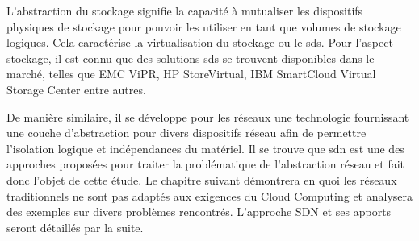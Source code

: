 L'abstraction du stockage signifie la capacité à mutualiser les dispositifs physiques de stockage pour pouvoir les utiliser en tant que volumes de stockage logiques. Cela caractérise la virtualisation du stockage ou le \gls{sds}. Pour l'aspect stockage, il est connu que des solutions \gls{sds} se trouvent disponibles dans le marché, telles que EMC ViPR, HP StoreVirtual, IBM SmartCloud Virtual Storage Center entre autres.

De manière similaire, il se développe pour les réseaux une technologie fournissant une couche d'abstraction pour divers dispositifs réseau afin de permettre l'isolation logique et indépendances du matériel. Il se trouve que \gls{sdn} est une des approches proposées pour traiter la problématique de l'abstraction réseau et fait donc l'objet de cette étude. Le chapitre suivant démontrera en quoi les réseaux traditionnels ne sont pas adaptés aux exigences du Cloud Computing et analysera des exemples sur divers problèmes rencontrés. L'approche SDN et ses apports seront détaillés par la suite.
\cite{ibmPlanningVirtCCchap1}  \cite{cloudReadyJuniperReferenceDef} \cite{journeySDDC} \cite{ciscoCCDCStrategyArchiSolutions}

